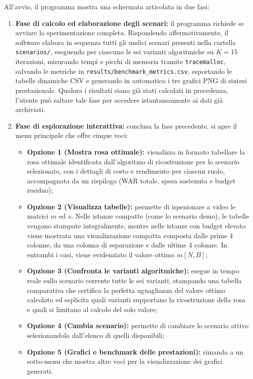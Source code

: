 All'avvio, il programma mostra una schermata articolata in due fasi:
\begin{enumerate}
	\item \textbf{Fase di calcolo ed elaborazione degli scenari:} il programma richiede se avviare la sperimentazione completa. Rispondendo affermativamente, il software elabora in sequenza tutti gli undici scenari presenti nella cartella \texttt{scenarios/}, eseguendo per ciascuno le sei varianti algoritmiche su $K = 15$ iterazioni, misurando tempi e picchi di memoria tramite \texttt{tracemalloc}, salvando le metriche in \texttt{results/benchmark\_metrics.csv}, esportando le tabelle dinamiche CSV e generando in automatico i tre grafici PNG di sintesi prestazionale. Qualora i risultati siano già stati calcolati in precedenza, l'utente può saltare tale fase per accedere istantaneamente ai dati già archiviati.
	\item \textbf{Fase di esplorazione interattiva:} conclusa la fase precedente, si apre il menu principale che offre cinque voci:
	\begin{itemize}
		\item \textbf{Opzione 1 (Mostra rosa ottimale):} visualizza in formato tabellare la rosa ottimale identificata dall'algoritmo di ricostruzione per lo scenario selezionato, con i dettagli di costo e rendimento per ciascun ruolo, accompagnata da un riepilogo (WAR totale, spesa sostenuta e budget residuo);
		\item \textbf{Opzione 2 (Visualizza tabelle):} permette di ispezionare a video le matrici $m$ ed $s$. Nelle istanze compatte (come lo scenario demo), le tabelle vengono stampate integralmente, mentre nelle istanze con budget elevato viene mostrata una visualizzazione compatta composta dalle prime 4 colonne, da una colonna di separazione e dalle ultime 4 colonne. In entrambi i casi, viene evidenziato il valore ottimo $m[N, B]$;
		\item \textbf{Opzione 3 (Confronta le varianti algoritmiche):} esegue in tempo reale sullo scenario corrente tutte le sei varianti, stampando una tabella comparativa che certifica la perfetta uguaglianza del valore ottimo calcolato ed esplicita quali varianti supportano la ricostruzione della rosa e quali si limitano al calcolo del solo valore;
		\item \textbf{Opzione 4 (Cambia scenario):} permette di cambiare lo scenario attivo selezionandolo dall'elenco di quelli disponibili;
		\item \textbf{Opzione 5 (Grafici e benchmark delle prestazioni):} rimanda a un sotto-menu che mostra altre voci per la visualizzazione dei grafici generati.
	\end{itemize}
\end{enumerate}

